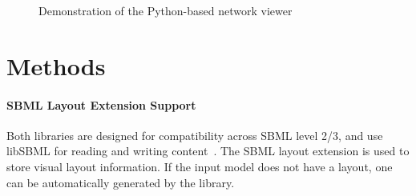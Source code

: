 \documentclass{bioinfo}
\begin{document}
\begin{figure}[!t]%
%


\caption{Demonstration of the Python-based network viewer}

\label{fig:01}
\end{figure}

\section{Methods}

\paragraph{SBML Layout Extension Support} 
Both libraries are designed for compatibility across SBML level 2/3, and use libSBML for reading and writing content~\citep{BornsteinLibSBML2008}. The SBML layout extension is used to store visual layout information. If the input model does not have a layout, one can be automatically generated by the library.
\end{document}

